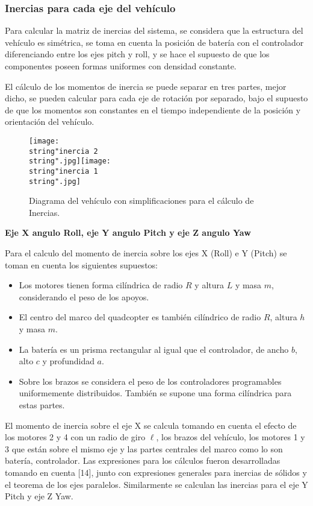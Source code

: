 \documentclass[\main/main.tex]{subfiles}
\begin{document}
\subsubsection{Inercias para cada eje del vehículo}

Para calcular la matriz de inercias del sistema, se considera que
la estructura del vehículo es simétrica, se toma en cuenta la posición
de batería con el controlador diferenciando entre los ejes pitch y
roll, y se hace el supuesto de que los componentes poseen formas uniformes
con densidad constante.

El cálculo de los momentos de inercia se puede separar en tres partes,
mejor dicho, se pueden calcular para cada eje de rotación por separado,
bajo el supuesto de que los momentos son constantes en el tiempo independiente
de la posición y orientación del vehículo.

\begin{figure}[H]
\noindent \begin{centering}
\texttt{[image: \\string"inercia 2\\string".jpg]}\texttt{[image: \\string"inercia 1\\string".jpg]}
\par\end{centering}
\caption{Diagrama del vehículo con simplificaciones para el cálculo de Inercias.}
\end{figure}

\textbf{Eje X angulo Roll, eje Y angulo Pitch y eje Z angulo Yaw}

Para el calculo del momento de inercia sobre los ejes X (Roll) e Y
(Pitch) se toman en cuenta los siguientes supuestos:
\begin{itemize}
\item Los motores tienen forma cilíndrica de radio $R$ y altura $L$ y
masa $m$, considerando el peso de los apoyos.
\item El centro del marco del quadcopter es también cilíndrico de radio
$R$, altura $h$ y masa $m$.
\item La batería es un prisma rectangular al igual que el controlador, de
ancho $b$, alto $c$ y profundidad $a$. 
\item Sobre los brazos se considera el peso de los controladores programables
uniformemente distribuidos. También se supone una forma cilíndrica
para estas partes.
\end{itemize}

El momento de inercia sobre el eje X se calcula tomando en cuenta el efecto
de los motores 2 y 4 con un radio de giro $\ell$, los brazos del vehículo, los motores 1 y 3 que están sobre
el mismo eje y las partes centrales del marco como lo son batería,
controlador. Las expresiones para los cálculos fueron desarrolladas tomando en cuenta [14], 
junto con expresiones generales para inercias de sólidos y el teorema de los ejes paralelos.
Similarmente se calculan las inercias para el eje Y Pitch y eje Z Yaw.
\end{document}
